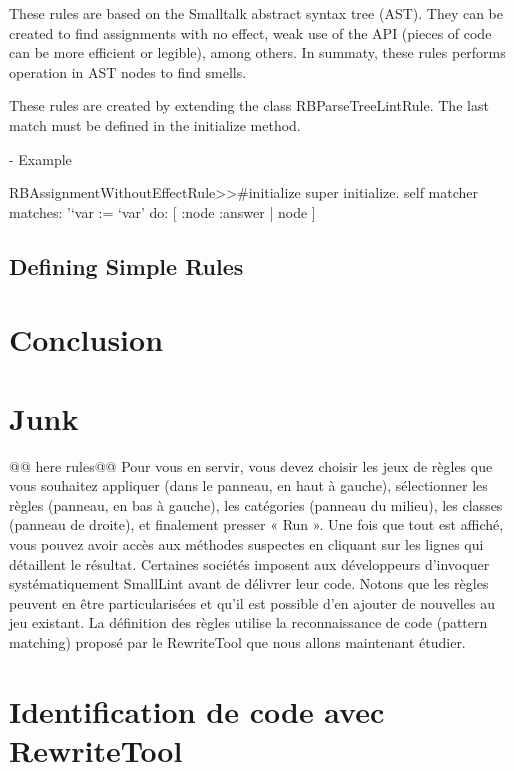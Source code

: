 \documentclass[a4paper,10pt,twoside]{book}
\begin{document}
These rules are based on the Smalltalk abstract syntax tree (AST). They can be created to find assignments with no effect, weak use of the API (pieces of code can be more efficient or legible), among others. In summaty, these rules performs operation in AST nodes to find smells.

These rules are created by extending the class RBParseTreeLintRule. The last match must be defined in the initialize method.


- Example

\begin{code}{}
RBAssignmentWithoutEffectRule>>#initialize
	super initialize.
	self matcher 
		matches: '`var := `var'
		do: [ :node :answer | node ]
\end{code}

\subsection{Defining Simple Rules}

\section{Conclusion}







\section{Junk}

@@ here rules@@
 Pour vous en servir,
vous devez choisir les jeux de r\`egles que vous souhaitez appliquer
(dans le panneau, en haut à gauche), s\'electionner les r\`egles (panneau,
en bas à gauche), les cat\'egories (panneau du milieu), les classes
(panneau de droite), et finalement presser « Run ». Une fois que tout
est affich\'e, vous pouvez avoir acc\`es aux m\'ethodes suspectes en
cliquant sur les lignes qui d\'etaillent le r\'esultat.  Certaines
soci\'et\'es imposent aux d\'eveloppeurs d'invoquer syst\'ematiquement
SmallLint avant de d\'elivrer leur code. Notons que les r\`egles peuvent
en être particularis\'ees et qu'il est possible d'en ajouter de
nouvelles au jeu existant. La d\'efinition des r\`egles utilise la
reconnaissance de code (pattern matching) propos\'e par le RewriteTool
que nous allons maintenant \'etudier.

\section{Identification de code avec RewriteTool}
\end{document}
